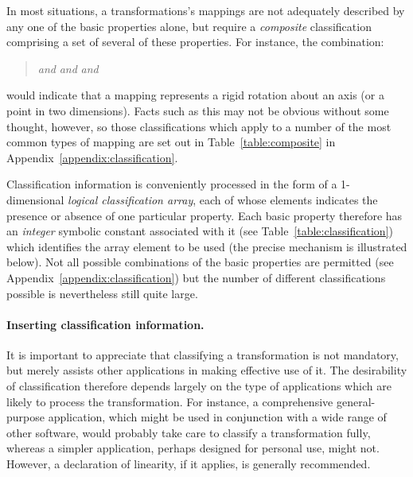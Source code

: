 In most situations, a transformations's mappings are not adequately
described by any one of the basic properties alone, but require a {\em
composite} classification comprising a set of several of these properties. 
For instance, the combination:

\begin{quote}
\begin{center}

 {\em and}  {\em and}  {\em 
and} 

\end{center}
\end{quote}

would indicate that a mapping represents a rigid rotation about an axis (or a
point in two dimensions). 
Facts such as this may not be obvious without some thought, however, so
those classifications which apply to a number of the most common types of
mapping are set out in Table~\ref{table:composite} in
Appendix~\ref{appendix:classification}. 

Classification information is conveniently processed in the form of a
1-dimensional {\em logical classification array}, each of whose elements
indicates the presence or absence of one particular property. 
Each basic property therefore has an {\em integer} symbolic constant
associated with it (see Table~\ref{table:classification}) which identifies
the array element to be used (the precise mechanism is illustrated below). 
Not all possible combinations of the basic properties are permitted (see
Appendix~\ref{appendix:classification}) but the number of different
classifications possible is nevertheless still quite large. 

\paragraph{Inserting classification information.}
It is important to appreciate that classifying a transformation is not
mandatory, but merely assists other applications in making effective
use of it.
The desirability of classification therefore depends largely on the type of
applications which are likely to process the transformation. 
For instance, a comprehensive general-purpose application, which might be
used in conjunction with a wide range of other software, would probably take
care to classify a transformation fully, whereas a simpler application,
perhaps designed for personal use, might not. 
However, a declaration of linearity, if it applies, is generally
recommended. 

